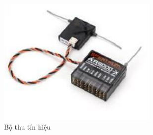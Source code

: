 \begin{itemize}
\begin{figure}[h!]
	        	\begin{center}
	        		\includegraphics[scale=0.8]{images/Cuong-Receiver.png}
	        		\caption{Bộ thu tín hiệu}
	        	\end{center}
        \end{figure}
        \end{itemize}

